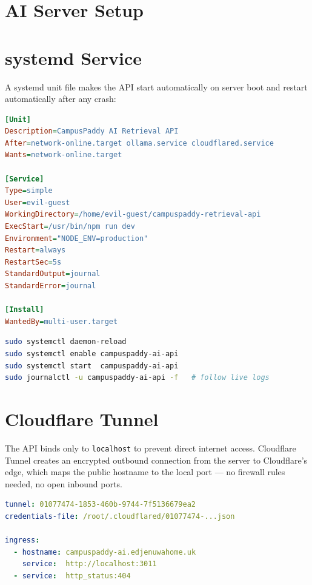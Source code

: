 \documentclass[12pt,a4paper]{report}
\begin{document}
\section{AI Server Setup}

\section{systemd Service}

A systemd unit file makes the API start automatically on server boot and restart automatically after any crash:

\begin{lstlisting}[language=ini, caption=/etc/systemd/system/campuspaddy-ai-api.service]
[Unit]
Description=CampusPaddy AI Retrieval API
After=network-online.target ollama.service cloudflared.service
Wants=network-online.target

[Service]
Type=simple
User=evil-guest
WorkingDirectory=/home/evil-guest/campuspaddy-retrieval-api
ExecStart=/usr/bin/npm run dev
Environment="NODE_ENV=production"
Restart=always
RestartSec=5s
StandardOutput=journal
StandardError=journal

[Install]
WantedBy=multi-user.target
\end{lstlisting}

\begin{lstlisting}[language=bash, caption=Enabling and starting the service]
sudo systemctl daemon-reload
sudo systemctl enable campuspaddy-ai-api
sudo systemctl start  campuspaddy-ai-api
sudo journalctl -u campuspaddy-ai-api -f   # follow live logs
\end{lstlisting}

\section{Cloudflare Tunnel}

The API binds only to \texttt{localhost} to prevent direct internet access. Cloudflare Tunnel creates an encrypted outbound connection from the server to Cloudflare's edge, which maps the public hostname to the local port --- no firewall rules needed, no open inbound ports.

\begin{lstlisting}[language=yaml, caption=/etc/cloudflared/config.yml]
tunnel: 01077474-1853-460b-9744-7f5136679ea2
credentials-file: /root/.cloudflared/01077474-...json

ingress:
  - hostname: campuspaddy-ai.edjenuwahome.uk
    service:  http://localhost:3011
  - service:  http_status:404
\end{lstlisting}
\end{document}
